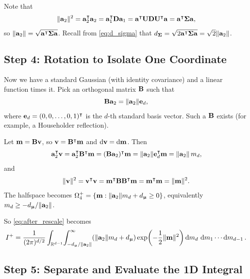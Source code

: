 \documentclass[11pt, letterpaper]{article}
\newcommand{\bSigma}{\vb{\Sigma}}
\newcommand{\bmu}{\boldsymbol{\upmu}}
\newcommand{\R}{\mathbb{R}}
\begin{document}
Note that
\begin{equation}
    \|\vb{a}_2\|^2 = \vb{a}_2^{\intercal}\vb{a}_2 = \vb{a}_1^{\intercal}\vb{D}\vb{a}_1 = \vb{a}^{\intercal}\vb{U}\vb{D}\vb{U}^{\intercal}\vb{a} = \vb{a}^{\intercal}\bSigma\vb{a},
\end{equation}
so $\|\vb{a}_2\| = \sqrt{\vb{a}^{\intercal}\bSigma\vb{a}}$. Recall from \cref{eq:d_sigma} that $d_{\bSigma} = \sqrt{2\vb{a}^{\intercal}\bSigma\vb{a}} = \sqrt{2}\|\vb{a}_2\|$.

\subsection{Step 4: Rotation to Isolate One Coordinate}

Now we have a standard Gaussian (with identity covariance) and a linear function times it. Pick an orthogonal matrix $\vb{B}$ such that
\begin{equation}
    \vb{B}\vb{a}_2 = \|\vb{a}_2\|\vb{e}_d,
\end{equation}
where $\vb{e}_d = (0, 0, \ldots, 0, 1)^{\intercal}$ is the $d$-th standard basis vector. Such a $\vb{B}$ exists (for example, a Householder reflection).

Let $\vb{m} = \vb{B}\vb{v}$, so $\vb{v} = \vb{B}^{\intercal}\vb{m}$ and $\dd{\vb{v}} = \dd{\vb{m}}$. Then
\begin{equation}
    \vb{a}_2^{\intercal}\vb{v} = \vb{a}_2^{\intercal}\vb{B}^{\intercal}\vb{m} = (\vb{B}\vb{a}_2)^{\intercal}\vb{m} = \|\vb{a}_2\|\vb{e}_d^{\intercal}\vb{m} = \|\vb{a}_2\|\,m_d,
\end{equation}
and
\begin{equation}
    \|\vb{v}\|^2 = \vb{v}^{\intercal}\vb{v} = \vb{m}^{\intercal}\vb{B}\vb{B}^{\intercal}\vb{m} = \vb{m}^{\intercal}\vb{m} = \|\vb{m}\|^2.
\end{equation}
The halfspace becomes $\Omega^+_4 = \{\vb{m} : \|\vb{a}_2\|m_d + d_{\bmu} \geq 0\}$, equivalently $m_d \geq -d_{\bmu}/\|\vb{a}_2\|$.

So \cref{eq:after_rescale} becomes
\begin{equation}
    I^+ = \frac{1}{(2\pi)^{d/2}} \int_{\R^{d-1}} \! \int_{-d_{\bmu}/\|\vb{a}_2\|}^{\infty} (\|\vb{a}_2\|m_d + d_{\bmu}) \exp\!\left(-\frac{1}{2}\|\vb{m}\|^2\right) \dd{m_d}\,\dd{m_1}\cdots\dd{m_{d-1}}.
\end{equation}

\subsection{Step 5: Separate and Evaluate the 1D Integral}
\end{document}

